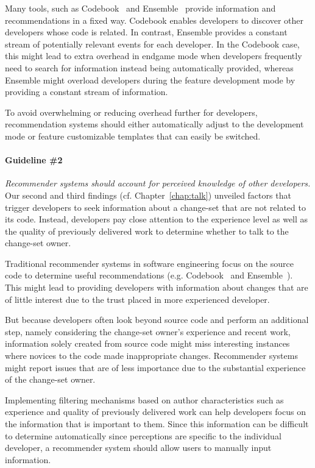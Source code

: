 Many tools, such as Codebook~\cite{begel:icse:2010} and Ensemble~\cite{xiang:rsse:2008} provide information and recommendations in a fixed way. 
Codebook enables developers to discover other developers whose code is related.
In contrast,  Ensemble provides a constant stream of potentially relevant events for each developer.
In the Codebook case, this might lead to extra overhead in endgame mode when developers frequently need to search for information instead being automatically provided, whereas Ensemble might overload developers during the feature development mode by providing a constant stream of information.

To avoid overwhelming or reducing overhead further for developers, recommendation systems should either automatically adjust to the development mode or feature customizable templates that can easily be switched. 

\paragraph{Guideline \#2} \emph{Recommender systems should account for perceived knowledge of other developers.}
Our second and third findings (cf. Chapter~\ref{chap:talk}) unveiled factors that trigger developers to seek information about a change-set that are not related to its code. 
Instead, developers pay close attention to the experience level as well as the quality of previously delivered work to determine whether to talk to the change-set owner.

Traditional recommender systems in software engineering focus on the source code to determine useful recommendations (e.g. Codebook~\cite{begel:icse:2010} and Ensemble~\cite{xiang:rsse:2008}).
This might lead to providing developers with information about changes that are of little interest due to the trust placed in more experienced developer. 

But because developers often look beyond source code and perform an additional step, namely considering the change-set owner's experience and recent work, information solely created from source code might miss interesting instances where novices to the code made inappropriate changes.
Recommender systems might report issues that are of less importance due to the substantial experience of the change-set owner.

Implementing filtering mechanisms based on author characteristics such as experience and quality of previously delivered work can help developers focus on the information that is important to them.
Since this information can be difficult to determine automatically since perceptions are specific to the individual developer, a recommender system should allow users to manually input information.


